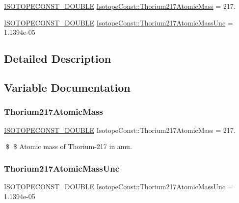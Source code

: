\begin{DoxyCompactItemize}
\item 
\mbox{\hyperlink{group___isotope_const-_macros_ga8f45a7272ce02c0b4c65c44636ed719a}{I\+S\+O\+T\+O\+P\+E\+C\+O\+N\+S\+T\+\_\+\+D\+O\+U\+B\+LE}} \mbox{\hyperlink{group___isotope_const-_thorium-_th217_ga3447ba64f0a135e06f0716f93da2808f}{Isotope\+Const\+::\+Thorium217\+Atomic\+Mass}} = 217.
\item 
\mbox{\hyperlink{group___isotope_const-_macros_ga8f45a7272ce02c0b4c65c44636ed719a}{I\+S\+O\+T\+O\+P\+E\+C\+O\+N\+S\+T\+\_\+\+D\+O\+U\+B\+LE}} \mbox{\hyperlink{group___isotope_const-_thorium-_th217_ga0cdf7ed4768cbe179e73784ff249478e}{Isotope\+Const\+::\+Thorium217\+Atomic\+Mass\+Unc}} = 1.\+1394e-\/05
\end{DoxyCompactItemize}


\subsection{Detailed Description}


\subsection{Variable Documentation}
\mbox{\label{group___isotope_const-_thorium-_th217_ga3447ba64f0a135e06f0716f93da2808f}} 
\subsubsection{\texorpdfstring{Thorium217\+Atomic\+Mass}{Thorium217AtomicMass}}
{\footnotesize\ttfamily \mbox{\hyperlink{group___isotope_const-_macros_ga8f45a7272ce02c0b4c65c44636ed719a}{I\+S\+O\+T\+O\+P\+E\+C\+O\+N\+S\+T\+\_\+\+D\+O\+U\+B\+LE}} Isotope\+Const\+::\+Thorium217\+Atomic\+Mass = 217.}

\$ \$ Atomic mass of Thorium-\/217 in amu. \mbox{\label{group___isotope_const-_thorium-_th217_ga0cdf7ed4768cbe179e73784ff249478e}} 
\subsubsection{\texorpdfstring{Thorium217\+Atomic\+Mass\+Unc}{Thorium217AtomicMassUnc}}
{\footnotesize\ttfamily \mbox{\hyperlink{group___isotope_const-_macros_ga8f45a7272ce02c0b4c65c44636ed719a}{I\+S\+O\+T\+O\+P\+E\+C\+O\+N\+S\+T\+\_\+\+D\+O\+U\+B\+LE}} Isotope\+Const\+::\+Thorium217\+Atomic\+Mass\+Unc = 1.\+1394e-\/05}

